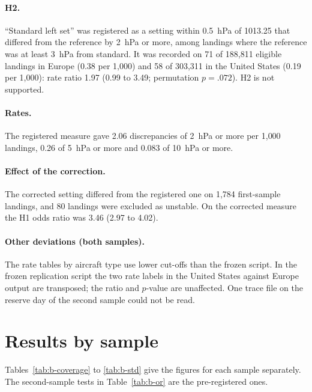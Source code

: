 \documentclass[11pt]{article}
\begin{document}
\paragraph{H2.} ``Standard left set'' was registered as a setting within 0.5~hPa of 1013.25 that differed from the reference by 2~hPa or more, among landings where the reference was at least 3~hPa from standard. It was recorded on 71 of 188{,}811 eligible landings in Europe (0.38 per 1{,}000) and 58 of 303{,}311 in the United States (0.19 per 1{,}000): rate ratio 1.97 (0.99 to 3.49; permutation $p = .072$). H2 is not supported.

\paragraph{Rates.} The registered measure gave 2.06 discrepancies of 2~hPa or more per 1{,}000 landings, 0.26 of 5~hPa or more and 0.083 of 10~hPa or more.

\paragraph{Effect of the correction.} The corrected setting differed from the registered one on 1{,}784 first-sample landings, and 80 landings were excluded as unstable. On the corrected measure the H1 odds ratio was 3.46 (2.97 to 4.02).

\paragraph{Other deviations (both samples).} The rate tables by aircraft type use lower cut-offs than the frozen script. In the frozen replication script the two rate labels in the United States against Europe output are transposed; the ratio and $p$-value are unaffected. One trace file on the reserve day of the second sample could not be read.


\section{Results by sample}\label{app:bysample}

Tables~\ref{tab:b-coverage} to \ref{tab:b-std} give the figures for each sample separately. The second-sample tests in Table~\ref{tab:b-or} are the pre-registered ones.
\end{document}
